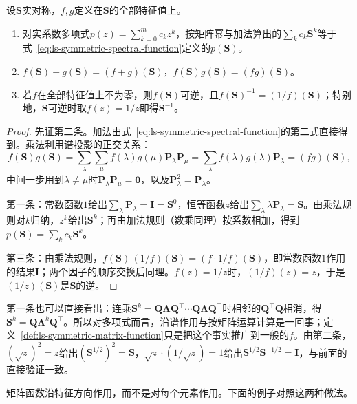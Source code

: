 \begin{lemma}[谱函数与矩阵运算相容]
\label{lem:ls-spectral-function-calculus}
设$\bm S$实对称，$f,g$定义在$\bm S$的全部特征值上。
\begin{enumerate}
 \item 对实系数多项式$p(z)=\sum_{k=0}^mc_kz^k$，按矩阵幂与加法算出的$\sum_kc_k\bm S^k$等于式~\eqref{eq:ls-symmetric-spectral-function}定义的$p(\bm S)$。
 \item $f(\bm S)+g(\bm S)=(f+g)(\bm S)$，$f(\bm S)g(\bm S)=(fg)(\bm S)$。
 \item 若$f$在全部特征值上不为零，则$f(\bm S)$可逆，且$f(\bm S)^{-1}=(1/f)(\bm S)$；特别地，$\bm S$可逆时取$f(z)=1/z$即得$\bm S^{-1}$。
\end{enumerate}
\end{lemma}
\begin{proof}
先证第二条。加法由式~\eqref{eq:ls-symmetric-spectral-function}的第二式直接得到。乘法利用谱投影的正交关系：
\[
 f(\bm S)g(\bm S)
 =\sum_\lambda\sum_\mu f(\lambda)g(\mu)\bm P_\lambda\bm P_\mu
 =\sum_\lambda f(\lambda)g(\lambda)\bm P_\lambda
 =(fg)(\bm S),
\]
中间一步用到$\lambda\neq\mu$时$\bm P_\lambda\bm P_\mu=\bm0$，以及$\bm P_\lambda^2=\bm P_\lambda$。

第一条：常数函数$1$给出$\sum_\lambda\bm P_\lambda=\bm I=\bm S^0$，恒等函数$z$给出$\sum_\lambda\lambda\bm P_\lambda=\bm S$。由乘法规则对$k$归纳，$z^k$给出$\bm S^k$；再由加法规则（数乘同理）按系数相加，得到$p(\bm S)=\sum_kc_k\bm S^k$。

第三条：由乘法规则，$f(\bm S)\,(1/f)(\bm S)=(f\cdot 1/f)(\bm S)$，即常数函数$1$作用的结果$\bm I$；两个因子的顺序交换后同理。$f(z)=1/z$时，$(1/f)(z)=z$，于是$(1/z)(\bm S)$是$\bm S$的逆。
\end{proof}

第一条也可以直接看出：连乘$\bm S^k=\bm Q\bm\Lambda\bm Q^\top\cdots\bm Q\bm\Lambda\bm Q^\top$时相邻的$\bm Q^\top\bm Q$相消，得$\bm S^k=\bm Q\bm\Lambda^k\bm Q^\top$。所以对多项式而言，沿谱作用与按矩阵运算计算是一回事；定义~\ref{def:ls-symmetric-matrix-function}只是把这个事实推广到一般的$f$。由第二条，$(\sqrt z)^2=z$给出$(\bm S^{1/2})^2=\bm S$，$\sqrt z\cdot(1/\sqrt z)=1$给出$\bm S^{1/2}\bm S^{-1/2}=\bm I$，与前面的直接验证一致。

矩阵函数沿特征方向作用，而不是对每个元素作用。下面的例子对照这两种做法。

